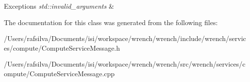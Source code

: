 \begin{DoxyExceptions}{Exceptions}
{\em std\+::invalid\+\_\+arguments} & \\
\hline
\end{DoxyExceptions}


The documentation for this class was generated from the following files\+:\begin{DoxyCompactItemize}
\item 
/\+Users/rafsilva/\+Documents/isi/workspace/wrench/wrench/include/wrench/services/compute/Compute\+Service\+Message.\+h\item 
/\+Users/rafsilva/\+Documents/isi/workspace/wrench/wrench/src/wrench/services/compute/Compute\+Service\+Message.\+cpp\end{DoxyCompactItemize}
